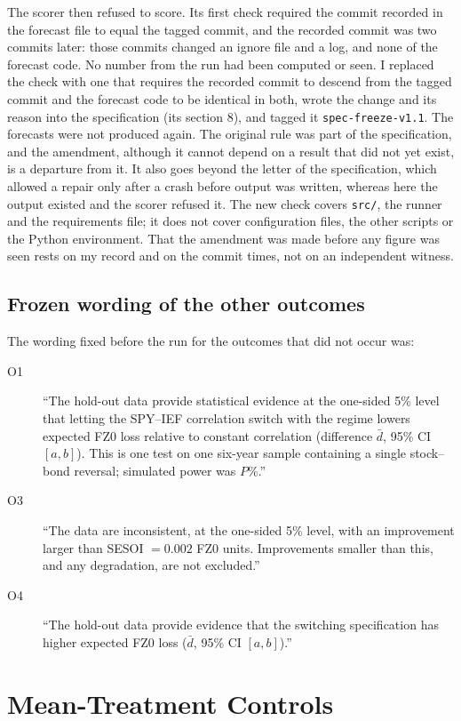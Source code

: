 The scorer then refused to score. Its first check required the commit recorded in the forecast file to equal the tagged commit, and the recorded commit was two commits later: those commits changed an ignore file and a log, and none of the forecast code. No number from the run had been computed or seen. I replaced the check with one that requires the recorded commit to descend from the tagged commit and the forecast code to be identical in both, wrote the change and its reason into the specification (its section 8), and tagged it \texttt{spec-freeze-v1.1}. The forecasts were not produced again. The original rule was part of the specification, and the amendment, although it cannot depend on a result that did not yet exist, is a departure from it. It also goes beyond the letter of the specification, which allowed a repair only after a crash before output was written, whereas here the output existed and the scorer refused it. The new check covers \texttt{src/}, the runner and the requirements file; it does not cover configuration files, the other scripts or the Python environment. That the amendment was made before any figure was seen rests on my record and on the commit times, not on an independent witness.

\subsection{Frozen wording of the other outcomes}\label{app:wording}

The wording fixed before the run for the outcomes that did not occur was:
\begin{description}
\item[O1] ``The hold-out data provide statistical evidence at the one-sided 5\% level that letting the SPY--IEF correlation switch with the regime lowers expected FZ0 loss relative to constant correlation (difference $\bar d$, 95\% CI $[a,b]$). This is one test on one six-year sample containing a single stock--bond reversal; simulated power was $P\%$.''
\item[O3] ``The data are inconsistent, at the one-sided 5\% level, with an improvement larger than SESOI $=0.002$ FZ0 units. Improvements smaller than this, and any degradation, are not excluded.''
\item[O4] ``The hold-out data provide evidence that the switching specification has higher expected FZ0 loss ($\bar d$, 95\% CI $[a,b]$).''
\end{description}

\section{Mean-Treatment Controls}\label{app:mean}

